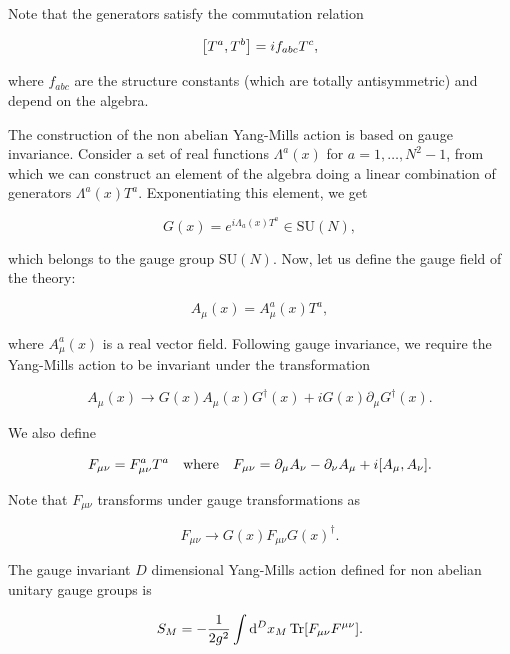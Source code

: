 \documentclass[reqno,12pt]{article}
\numberwithin{equation}{section}
\newcommand{\SU}{\mathrm{SU}}
\begin{document}
Note that the generators satisfy the commutation relation

\begin{equation}
	\qty[T^a, T^b] = if_{abc} T^c,	
\end{equation}

where $f_{abc}$ are the structure constants (which are totally antisymmetric) and depend on the algebra. 

The construction of the non abelian Yang-Mills action is based on gauge invariance. Consider a set of real functions $\Lambda^a(x)$ 
for $a = 1, \dots, N^2 - 1$, from which we can construct an element of the algebra doing a linear combination of generators
$\Lambda^a(x)T^a$. Exponentiating this element, we get 

\begin{equation} \label{eq:gauge_trans}
	G(x) = e^{i \Lambda_a(x) T^a} \in \SU(N),
\end{equation}

which belongs to the gauge group $\SU(N)$. Now, let us define the gauge field of the theory: 

\begin{equation}
	A_\mu(x) = A_\mu^a(x) T^a,
\end{equation}

where $A_\mu^a(x)$ is a real vector field. Following gauge invariance, we require the Yang-Mills action to be invariant
under the transformation

\begin{equation} \label{eq:A_mu_gauge_trans}
	A_\mu(x) \rightarrow G(x) A_\mu(x) G^\dagger(x) + i G(x) \partial_\mu G^\dagger(x).
\end{equation}

We also define

\begin{equation}
	F_{\mu\nu} = F_{\mu\nu}^a T^a \qq{where} 
	F_{\mu\nu} = \partial_\mu A_\nu - \partial_\nu A_\mu + i \qty[A_\mu, A_\nu].
\end{equation}

Note that $F_{\mu\nu}$ transforms under gauge transformations as

\begin{equation}
	F_{\mu\nu} \rightarrow G(x) F_{\mu\nu} G(x)^\dagger.
\end{equation}

The gauge invariant $D$ dimensional Yang-Mills action 
defined for non abelian unitary gauge groups is

\begin{equation} \label{eq:ym_action_mink}
	S_M = -\frac{1}{2g^2} \int \dd[D]{x_M} \Tr[F_{\mu\nu}F^{\mu\nu}].
\end{equation}
\end{document}
